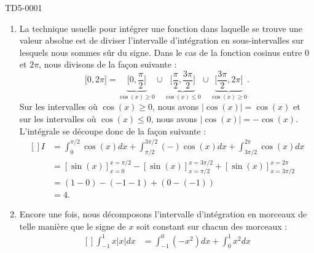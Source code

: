 
\begin{corrige}{TD5-0001}

			\newcommand{\CaptionFigUnSurxInt}{La surface achurée à gauche est la même que la surface achurée à droite. Seul le signe change lorsqu'on veut calculer l'intégrale.}
			

	\begin{enumerate}
		\item
			La technique usuelle pour intégrer une fonction dans laquelle se trouve une valeur absolue est de diviser l'intervalle d'intégration en sous-intervalles sur lesquels nous sommes sûr du signe. Dans le cas de la fonction cosinus entre $0$ et $2\pi$, nous divisons de la façon suivante :
			\begin{equation}
				\mathopen[ 0 , 2\pi \mathclose]=\underbrace{\mathopen[ 0 , \frac{ \pi }{2} \mathclose]}_{\cos(x)\geq 0}\cup\underbrace{\mathopen[ \frac{ \pi }{2} , \frac{ 3\pi }{2} \mathclose]}_{\cos(x)\leq 0}\cup\underbrace{\mathopen[ \frac{ 3\pi }{2} , 2\pi \mathclose]}_{\cos(x)\geq 0}.
			\end{equation}
			Sur les intervalles où $\cos(x)\geq 0$, nous avons $| \cos(x) |=\cos(x)$ et sur les intervalles où $\cos(x)\leq 0$, nous avons $| \cos(x) |=-\cos(x)$. L'intégrale se découpe donc de la façon suivante :
			\begin{equation}
				\begin{aligned}[]
					I&=\int_{0}^{\pi/2}\cos(x)dx+\int_{\pi/2}^{3\pi/2}(-)\cos(x)dx+\int_{3\pi/2}^{2\pi}\cos(x)dx\\
					&=[\sin(x)]_{x=0}^{x=\pi/2}-[\sin(x)]_{x=\pi/2}^{x=3\pi/2}+[\sin(x)]_{x=3\pi/2}^{x=2\pi}\\
					&=(1-0)-(-1-1)+(0-(-1))\\
					&=4.
				\end{aligned}
			\end{equation}
		\item
			Encore une fois, nous décomposons l'intervalle d'intégration en morceaux de telle manière que le signe de $x$ soit constant sur chacun des morceaux :
			\begin{equation}
				\begin{aligned}[]
					\int_{-1}^1x| x |dx&=\int_{-1}^0(-x^2)dx+\int_0^1x^2dx\\

\end{aligned}
\end{equation}
\end{enumerate}
\end{corrige}
